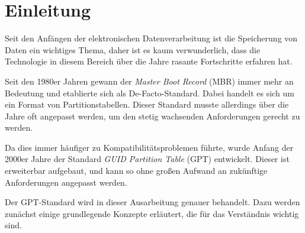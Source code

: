 \section{Einleitung}
Seit den Anfängen der elektronischen Datenverarbeitung ist die Speicherung von Daten ein wichtiges Thema, daher ist es kaum verwunderlich, dass die Technologie in diesem Bereich über die Jahre rasante Fortschritte erfahren hat.

Seit den 1980er Jahren gewann der \textit{Master Boot Record} (MBR) immer mehr an Bedeutung und etablierte sich als De-Facto-Standard.
Dabei handelt es sich um ein Format von Partitionstabellen.
Dieser Standard musste allerdings über die Jahre oft angepasst werden, um den stetig wachsenden Anforderungen gerecht zu werden.

Da dies immer häufiger zu Kompatibilitätsproblemen führte, wurde Anfang der 2000er Jahre der Standard \textit{GUID Partition Table} (GPT) entwickelt.
Dieser ist erweiterbar aufgebaut, und kann so ohne großen Aufwand an zukünftige Anforderungen angepasst werden.

Der GPT-Standard wird in dieser Ausarbeitung genauer behandelt.
Dazu werden zunächst einige grundlegende Konzepte erläutert, die für das Verständnis wichtig sind.
